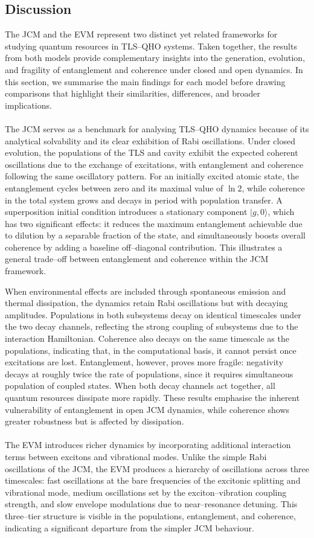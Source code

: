 \documentclass[11pt]{article}
\begin{document}
\subsection{Discussion}
The JCM and the EVM represent two distinct yet related frameworks for studying quantum resources in TLS--QHO systems. Taken together, the results from both models provide complementary insights into the generation, evolution, and fragility of entanglement and coherence under closed and open dynamics. In this section, we summarise the main findings for each model before drawing comparisons that highlight their similarities, differences, and broader implications.\\
\\
The JCM serves as a benchmark for analysing TLS--QHO dynamics because of its analytical solvability and its clear exhibition of Rabi oscillations. Under closed evolution, the populations of the TLS and cavity exhibit the expected coherent oscillations due to the exchange of excitations, with entanglement and coherence following the same oscillatory pattern. For an initially excited atomic state, the entanglement cycles between zero and its maximal value of $\ln2$, while coherence in the total system grows and decays in period with population transfer. A superposition initial condition introduces a stationary component $|g,0\rangle$, which has two significant effects: it reduces the maximum entanglement achievable due to dilution by a separable fraction of the state, and simultaneously boosts overall coherence by adding a baseline off--diagonal contribution. This illustrates a general trade--off between entanglement and coherence within the JCM framework.

When environmental effects are included through spontaneous emission and thermal dissipation, the dynamics retain Rabi oscillations but with decaying amplitudes. Populations in both subsystems decay on identical timescales under the two decay channels, reflecting the strong coupling of subsystems due to the interaction Hamiltonian. Coherence also decays on the same timescale as the populations, indicating that, in the computational basis, it cannot persist once excitations are lost. Entanglement, however, proves more fragile: negativity decays at roughly twice the rate of populations, since it requires simultaneous population of coupled states. When both decay channels act together, all quantum resources dissipate more rapidly. These results emphasise the inherent vulnerability of entanglement in open JCM dynamics, while coherence shows greater robustness but is affected by dissipation.\\
\\
The EVM introduces richer dynamics by incorporating additional interaction terms between excitons and vibrational modes. Unlike the simple Rabi oscillations of the JCM, the EVM produces a hierarchy of oscillations across three timescales: fast oscillations at the bare frequencies of the excitonic splitting and vibrational mode, medium oscillations set by the exciton--vibration coupling strength, and slow envelope modulations due to near--resonance detuning. This three--tier structure is visible in the populations, entanglement, and coherence, indicating a significant departure from the simpler JCM behaviour.
\end{document}

